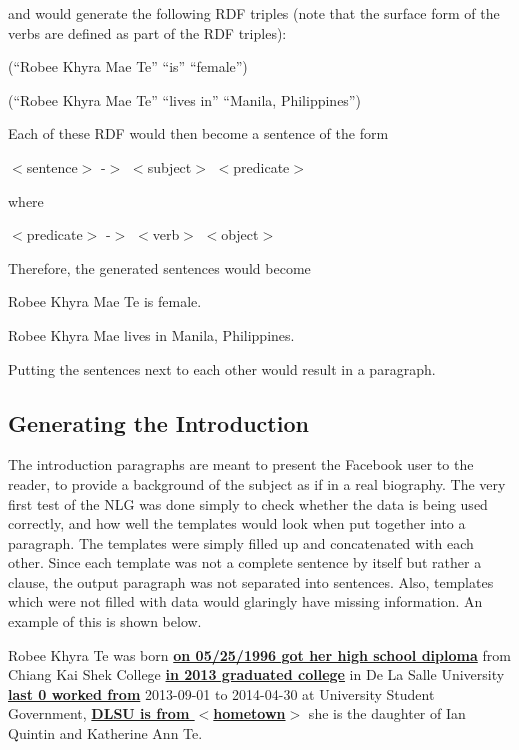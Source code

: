 and would generate the following RDF triples (note that the surface form of the verbs are defined as part of the RDF triples):

\begin{center} (``Robee Khyra Mae Te'' ``is'' ``female'') \end{center}
\begin{center} (``Robee Khyra Mae Te'' ``lives in'' ``Manila, Philippines'') \end{center}

Each of these RDF would then become a sentence of the form

\begin{center} $<$sentence$>$	-$>$	$<$subject$>$ $<$predicate$>$ \end{center}

where

\begin{center} $<$predicate$>$	-$>$	$<$verb$>$ $<$object$>$ \end{center}

Therefore, the generated sentences would become

\begin{center} Robee Khyra Mae Te is female. \end{center}
\begin{center} Robee Khyra Mae lives in Manila, Philippines. \end{center}

Putting the sentences next to each other would result in a paragraph. 

\subsection{Generating the Introduction}
The introduction paragraphs are meant to present the Facebook user to the reader, to provide a background of the subject as if in a real biography. The very first test of the NLG was done simply to check whether the data is being used correctly, and how well the templates would look when put together into a paragraph. The templates were simply filled up and concatenated with each other. Since each template was not a complete sentence by itself but rather a clause, the output paragraph was not separated into sentences. Also, templates which were not filled with data would glaringly have missing information. An example of this is shown below.

\begin{center} Robee Khyra Te was born \underline{\textbf{on 05/25/1996 got her high school diploma}} from Chiang Kai Shek College \underline{\textbf{in 2013 graduated college}}  in De La Salle University \underline{\textbf{last 0 worked from}} 2013-09-01 to 2014-04-30 at University Student Government, \underline{\textbf{DLSU is from $<$hometown$>$}} she is the daughter of Ian Quintin and Katherine Ann Te.
 \end{center}

